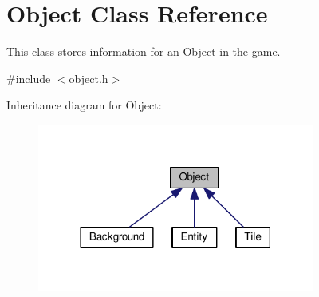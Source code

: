\hypertarget{classObject}{}\section{Object Class Reference}
\label{classObject}


This class stores information for an \hyperlink{classObject}{Object} in the game.  




{\ttfamily \#include $<$object.\+h$>$}



Inheritance diagram for Object\+:\nopagebreak
\begin{figure}[H]
\begin{center}
\leavevmode
\includegraphics[width=258pt]{classObject__inherit__graph}
\end{center}
\end{figure}
